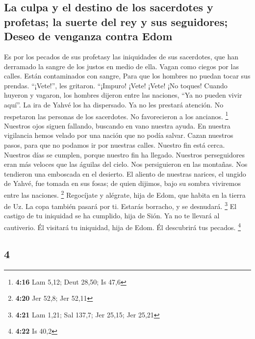 \begin{paracol}{2}
\hypertarget{la-culpa-y-el-destino-de-los-sacerdotes-y-profetas-la-suerte-del-rey-y-sus-seguidores-deseo-de-venganza-contra-edom}{%
\subsection{La culpa y el destino de los sacerdotes y profetas; la
suerte del rey y sus seguidores; Deseo de venganza contra
Edom}\label{la-culpa-y-el-destino-de-los-sacerdotes-y-profetas-la-suerte-del-rey-y-sus-seguidores-deseo-de-venganza-contra-edom}}

 Es por los pecados de sus profetasy las iniquidades de
sus sacerdotes, que han derramado la sangre de los justos en medio de
ella.  Vagan como ciegos por las calles. Están
contaminados con sangre, Para que los hombres no puedan tocar sus
prendas.  ``¡Vete!'', les gritaron. ``¡Impuro! ¡Vete!
¡Vete! ¡No toques! Cuando huyeron y vagaron, los hombres dijeron entre
las naciones, ``Ya no pueden vivir aquí''.  La ira de
Yahvé los ha dispersado. Ya no les prestará atención. No respetaron las
personas de los sacerdotes. No favorecieron a los ancianos. \footnote{\textbf{4:16}
  Lam 5,12; Deut 28,50; Is 47,6}  Nuestros ojos siguen
fallando, buscando en vano nuestra ayuda. En nuestra vigilancia hemos
velado por una nación que no podía salvar.  Cazan
nuestros pasos, para que no podamos ir por nuestras calles. Nuestro fin
está cerca. Nuestros días se cumplen, porque nuestro fin ha llegado.
 Nuestros perseguidores eran más veloces que las águilas
del cielo. Nos persiguieron en las montañas. Nos tendieron una emboscada
en el desierto.  El aliento de nuestras narices, el
ungido de Yahvé, fue tomada en sus fosas; de quien dijimos, bajo su
sombra viviremos entre las naciones. \footnote{\textbf{4:20} Jer 52,8;
  Jer 52,11}  Regocíjate y alégrate, hija de Edom, que
habita en la tierra de Uz. La copa también pasará por ti. Estarás
borracho, y se desnudará. \footnote{\textbf{4:21} Lam 1,21; Sal 137,7;
  Jer 25,15; Jer 25,21}  El castigo de tu iniquidad se ha
cumplido, hija de Sión. Ya no te llevará al cautiverio. Él visitará tu
iniquidad, hija de Edom. Él descubrirá tus pecados. \footnote{\textbf{4:22}
  Is 40,2}

\switchcolumn
\begin{otherlanguage}{english}

\hypertarget{section-7}{%
\section{4}\label{section-7}}


\end{otherlanguage}
\end{paracol}
